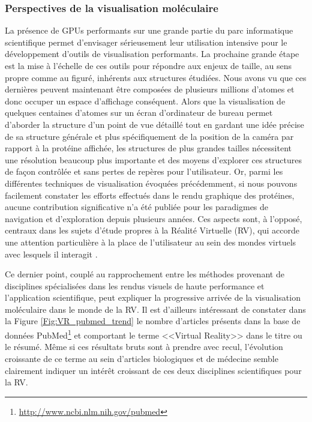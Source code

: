 

\subsubsection{Perspectives de la visualisation moléculaire}

La présence de GPUs performants sur une grande partie du parc informatique scientifique permet d'envisager sérieusement leur utilisation intensive pour le développement d'outils de visualisation performants. La prochaine grande étape est la mise à l'échelle de ces outils pour répondre aux enjeux de taille, au sens propre comme au figuré, inhérents aux structures étudiées. Nous avons vu que ces dernières peuvent maintenant être composées de plusieurs millions d'atomes et donc occuper un espace d'affichage conséquent. Alors que la visualisation de quelques centaines d'atomes sur un écran d'ordinateur de bureau permet d'aborder la structure d'un point de vue détaillé tout en gardant une idée précise de sa structure générale et plus spécifiquement de la position de la caméra par rapport à la protéine affichée, les structures de plus grandes tailles nécessitent une résolution beaucoup plus importante et des moyens d'explorer ces structures de façon contrôlée et sans pertes de repères pour l'utilisateur. Or, parmi les différentes techniques de visualisation évoquées précédemment, si nous pouvons facilement constater les efforts effectués dans le rendu graphique des protéines, aucune contribution significative n'a été publiée pour les paradigmes de navigation et d'exploration depuis plusieurs années. Ces aspects sont, à l'opposé, centraux dans les sujets d'étude propres à la Réalité Virtuelle (RV), qui accorde une attention particulière à la place de l'utilisateur au sein des mondes virtuels avec lesquels il interagit \cite{ortega_shocam_2015, khan_hovercam:_2005, he_virtual_1996}.

Ce dernier point, couplé au rapprochement entre les méthodes provenant de disciplines spécialisées dans les rendus visuels de haute performance et l'application scientifique, peut expliquer la progressive arrivée de la visualisation moléculaire dans le monde de la RV. Il est d'ailleurs intéressant de constater dans la Figure \ref{Fig:VR_pubmed_trend} le nombre d'articles présents dans la base de données PubMed\footnote{\url{http://www.ncbi.nlm.nih.gov/pubmed}} et comportant le terme <<Virtual Reality>> dans le titre ou le résumé. Même si ces résultats bruts sont à prendre avec recul, l'évolution croissante de ce terme au sein d'articles biologiques et de médecine semble clairement indiquer un intérêt croissant de ces deux disciplines scientifiques pour la RV.

